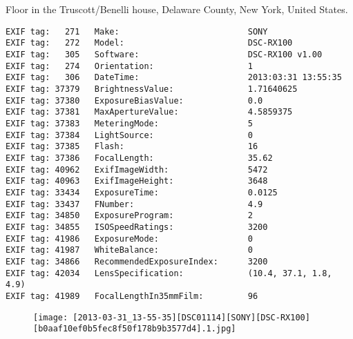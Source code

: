 \section{\protect{}}
\noindent Floor in the Truscott/Benelli house, Delaware County, New York, United States.
\noindent
\begin{lstlisting}
EXIF tag:   271   Make:                          SONY
EXIF tag:   272   Model:                         DSC-RX100
EXIF tag:   305   Software:                      DSC-RX100 v1.00
EXIF tag:   274   Orientation:                   1
EXIF tag:   306   DateTime:                      2013:03:31 13:55:35
EXIF tag: 37379   BrightnessValue:               1.71640625
EXIF tag: 37380   ExposureBiasValue:             0.0
EXIF tag: 37381   MaxApertureValue:              4.5859375
EXIF tag: 37383   MeteringMode:                  5
EXIF tag: 37384   LightSource:                   0
EXIF tag: 37385   Flash:                         16
EXIF tag: 37386   FocalLength:                   35.62
EXIF tag: 40962   ExifImageWidth:                5472
EXIF tag: 40963   ExifImageHeight:               3648
EXIF tag: 33434   ExposureTime:                  0.0125
EXIF tag: 33437   FNumber:                       4.9
EXIF tag: 34850   ExposureProgram:               2
EXIF tag: 34855   ISOSpeedRatings:               3200
EXIF tag: 41986   ExposureMode:                  0
EXIF tag: 41987   WhiteBalance:                  0
EXIF tag: 34866   RecommendedExposureIndex:      3200
EXIF tag: 42034   LensSpecification:             (10.4, 37.1, 1.8, 4.9)
EXIF tag: 41989   FocalLengthIn35mmFilm:         96

\end{lstlisting}
\clearpage
\begin{figure}
\raggedleft
\texttt{[image: [2013-03-31\_13-55-35][DSC01114][SONY][DSC-RX100][b0aaf10ef0b5fec8f50f178b9b3577d4].1.jpg]}
\end{figure}


\clearpage
